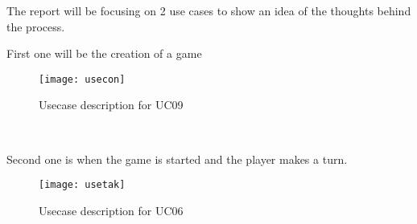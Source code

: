 The report will be focusing on 2 use cases to show an idea of the thoughts
 behind the process.\clearpage

First one will be the creation of a game\\

\begin{figure}[h]
\centering
\texttt{[image: usecon]}
\caption{Usecase description for UC09}
\end{figure}\\
\clearpage

Second one is when the game is started and the player makes a turn.\\

\begin{figure}[h]
\centering
\texttt{[image: usetak]}
\caption{Usecase description for UC06}
\end{figure}
